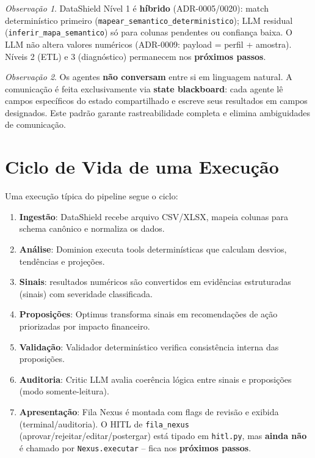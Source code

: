 \documentclass[a4paper, 12pt]{report}
\theoremstyle{definition}
\theoremstyle{remark}
\newtheorem{observacao}{Observa\c{c}\~ao}[chapter]
\begin{document}
\begin{observacao}
  DataShield N\'ivel 1 \'e \textbf{h\'ibrido} (ADR-0005/0020):
  match determin\'istico primeiro
  (\texttt{mapear\_semantico\_deterministico}); LLM residual
  (\texttt{inferir\_mapa\_semantico}) s\'o para colunas pendentes
  ou confian\c{c}a baixa. O LLM n\~ao altera valores num\'ericos
  (ADR-0009: payload = perfil + amostra). N\'iveis 2 (ETL) e 3
  (diagn\'ostico) permanecem nos \textbf{pr\'oximos passos}.
\end{observacao}

\begin{observacao}
  Os agentes \textbf{n\~ao conversam} entre si em linguagem natural.
  A comunica\c{c}\~ao \'e feita exclusivamente via \textbf{state blackboard}:
  cada agente l\^e campos espec\'ificos do estado compartilhado e escreve
  seus resultados em campos designados. Este padr\~ao garante
  rastreabilidade completa e elimina ambiguidades de comunica\c{c}\~ao.
\end{observacao}


\section{Ciclo de Vida de uma Execu\c{c}\~ao}

Uma execu\c{c}\~ao t\'ipica do pipeline segue o ciclo:

\begin{enumerate}
  \item \textbf{Ingest\~ao}: DataShield recebe arquivo CSV/XLSX, mapeia
    colunas para schema can\^onico e normaliza os dados.
  \item \textbf{An\'alise}: Dominion executa tools determin\'isticas que
    calculam desvios, tend\^encias e proje\c{c}\~oes.
  \item \textbf{Sinais}: resultados num\'ericos s\~ao convertidos em
    evid\^encias estruturadas (sinais) com severidade classificada.
  \item \textbf{Proposi\c{c}\~oes}: Optimus transforma sinais em
    recomenda\c{c}\~oes de a\c{c}\~ao priorizadas por impacto financeiro.
  \item \textbf{Valida\c{c}\~ao}: Validador determin\'istico verifica
    consist\^encia interna das proposi\c{c}\~oes.
  \item \textbf{Auditoria}: Critic LLM avalia coer\^encia l\'ogica entre
    sinais e proposi\c{c}\~oes (modo somente-leitura).
  \item \textbf{Apresenta\c{c}\~ao}: Fila Nexus \'e montada com flags de
    revis\~ao e exibida (terminal/auditoria). O HITL de
    \texttt{fila\_nexus} (aprovar/rejeitar/editar/postergar) est\'a
    tipado em \texttt{hitl.py}, mas \textbf{ainda n\~ao} \'e chamado
    por \texttt{Nexus.executar} -- fica nos \textbf{pr\'oximos passos}.
\end{enumerate}
\end{document}
